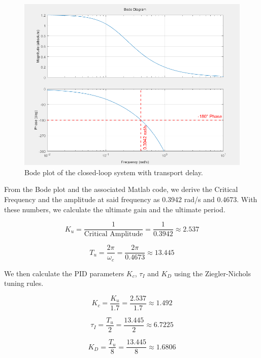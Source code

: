 \documentclass[12pt]{article}
\begin{document}
\begin{enumerate}
\begin{enumerate}
    \begin{figure}[H]
      \centering
      \includegraphics[width=\textwidth]{Figures/figure2-2.png}
      \caption{Bode plot of the closed-loop system with transport delay.}
      \label{fig:figure2_2}
    \end{figure}

    From the Bode plot and the associated Matlab code, we derive the Critical Frequency and the amplitude at said frequency as 0.3942 rad/s and 0.4673. With these numbers, we calculate the ultimate gain and the ultimate period.

    \[
    K_u = \frac{1}{\text{Critical Amplitude}} = \frac{1}{0.3942} \approx 2.537
    \]

    \[
    T_u = \frac{2\pi}{\omega_c} = \frac{2\pi}{0.4673} \approx 13.445
    \]

    We then calculate the PID parameters $K_c$, $\tau_I$ and $K_D$ using the Ziegler-Nichols tuning rules.

    \[
    K_c = \frac{K_u}{1.7} = \frac{2.537}{1.7}\approx 1.492
    \]

    \[
    \tau_I = \frac{T_u}{2} = \frac{13.445}{2} \approx 6.7225
    \]

    \[
    K_D = \frac{T_u}{8} = \frac{13.445}{8} \approx 1.6806
    \]



      


    

  \end{enumerate}

\end{enumerate}
\end{document}
